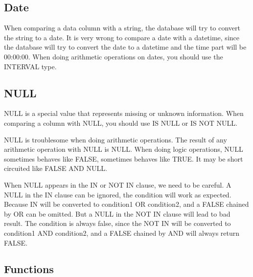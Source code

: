 \documentclass[a4paper,12pt]{article}
\begin{document}
\subsection{Date}

When comparing a data column with a string, the database will try to convert the string to a date.
It is very wrong to compare a date with a datetime, since the database will try to convert the date to a datetime and the time part will be 00:00:00.
When doing arithmetic operations on dates, you should use the INTERVAL type.

\subsection{NULL}

NULL is a special value that represents missing or unknown information.
When comparing a column with NULL, you should use IS NULL or IS NOT NULL.

NULL is troublesome when doing arithmetic operations.
The result of any arithmetic operation with NULL is NULL.
When doing logic operations, NULL sometimes behaves like FALSE, sometimes behaves like TRUE.
It may be short circuited like FALSE AND NULL.

When NULL appears in the IN or NOT IN clause, we need to be careful.
A NULL in the IN clause can be ignored, the condition will work as expected.
Because IN will be converted to condition1 OR condition2, and a FALSE chained by OR can be omitted.
But a NULL in the NOT IN clause will lead to bad result.
The condition is always false, since the NOT IN will be converted to condition1 AND condition2, and a FALSE chained by AND will always return FALSE.

\subsection{Functions}
\end{document}
